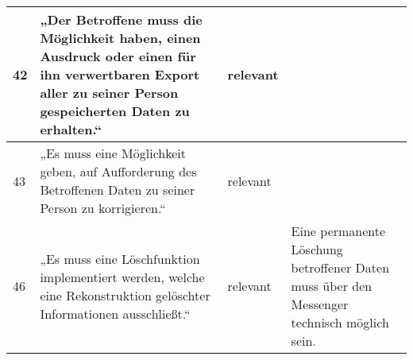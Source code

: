 \begin{longtable}{p{0.6cm}|p{6cm}|p{2cm}|p{6cm}}
    42     & „Der Betroffene muss die Möglichkeit haben, einen Ausdruck oder einen für ihn verwertbaren Export aller zu seiner Person gespeicherten Daten zu erhalten.“                                                                                                                                           & relevant           &                                                                                                                                                                                                                                                                                                                                                                                                                                                                                                                                                                     \\ \hline
    43     & „Es muss eine Möglichkeit geben, auf Aufforderung des Betroffenen Daten zu seiner Person zu korrigieren.“                                                                                                                                                                                            & relevant           &                                                                                                                                                                                                                                                                                                                                                                                                                                                                                                                                                                     \\ \hline
    46     & „Es muss eine Löschfunktion implementiert werden, welche eine Rekonstruktion gelöschter Informationen ausschließt.“                                                                                                                                                                                  & relevant           & Eine permanente Löschung betroffener Daten muss über den Messenger technisch möglich sein.                                                                                                                                                                                                                                                                                                                                                                                                                                                                          \\ \hline

\end{longtable}
